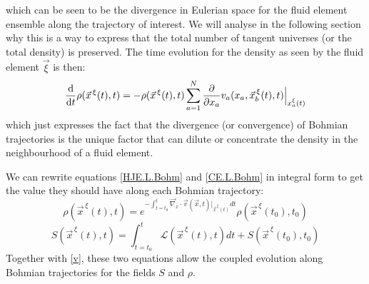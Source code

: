 \documentclass[11pt, a4paper]{article} %
\newcommand{\Lg}{\mathscr{L}}
\begin{document}
which can be seen to be the divergence in Eulerian space for the fluid element ensemble along the trajectory of interest. We will analyse in the following section why this is a way to express that the total number of tangent universes (or the total density) is preserved. The time evolution for the density as seen by the fluid element $\vec{\xi}$ is then:
\begin{equation}\label{CE.L.Bohm}
\dv{}{t}\rho(\vec{x}^{\, \xi}(t),t)=-\rho(\vec{x}^{\, \xi}(t),t)\sum_{a=1}^N\pdv{}{x_a} v_a(x_a, \vec{x}_b^{\, \xi}(t),t)\Big\rvert_{x_a^\xi(t)}
\end{equation}
which just expresses the fact that the divergence (or convergence) of Bohmian trajectories is the unique factor that can dilute or concentrate the density in the neighbourhood of a fluid element.

We can rewrite equations \eqref{HJE.L.Bohm} and \eqref{CE.L.Bohm} in integral form to get the value they should have along each Bohmian trajectory:
\begin{equation}\label{JacPre.Bohm}
\rho(\vec{x}^{\, \xi}(t),t)=e^{-\int_{t=t_0}^t \vec{\nabla}_x\cdot \vec{v}(\vec{x},t)\rvert_{\vec{x}^{\, \xi}(t)} dt}\rho(\vec{x}^{\, \xi}(t_0),t_0)
\end{equation}
\begin{equation}\label{ActPre.Bohm}
S(\vec{x}^{\, \xi}(t),t)=\int_{t=t_0}^t \Lg(\vec{x}^{\, \xi}(t),t) dt+S(\vec{x}^{\, \xi}(t_0),t_0)
\end{equation}
Together with \eqref{v}, these two equations allow the coupled evolution along Bohmian trajectories for the fields $S$ and $\rho$. 
\end{document}
